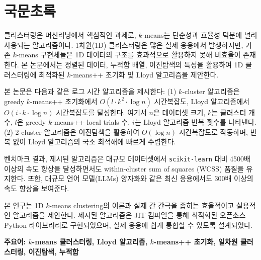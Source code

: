 \chapter*{국문초록}

클러스터링은 머신러닝에서 핵심적인 과제로, $k$-means는 단순성과 효율성 덕분에 널리 사용되는 알고리즘이다. 1차원(1D) 클러스터링은 많은 실제 응용에서 발생하지만, 기존 $k$-means 구현체들은 1D 데이터의 구조를 효과적으로 활용하지 못해 비효율이 존재한다. 본 논문에서는 정렬된 데이터, 누적합 배열, 이진탐색의 특성을 활용하여 1D 클러스터링에 최적화된 $k$-means++ 초기화 및 Lloyd 알고리즘을 제안한다.

본 논문은 다음과 같은 로그 시간 알고리즘을 제시한다: (1) \(k\)-cluster 알고리즘은 greedy $k$-means++ 초기화에서 \(O(l \cdot k^2 \cdot \log n)\) 시간복잡도, Lloyd 알고리즘에서 \(O(i \cdot k \cdot \log n)\) 시간복잡도를 달성한다. 여기서 \(n\)은 데이터셋 크기, \(k\)는 클러스터 개수, \(l\)은 greedy $k$-means++ local trials 수, \(i\)는 Lloyd 알고리즘 반복 횟수를 나타낸다. (2) 2-cluster 알고리즘은 이진탐색을 활용하여 \(O(\log n)\) 시간복잡도로 작동하며, 반복 없이 Lloyd 알고리즘의 국소 최적해에 빠르게 수렴한다.

벤치마크 결과, 제시된 알고리즘은 대규모 데이터셋에서 \texttt{scikit-learn} 대비 4500배 이상의 속도 향상을 달성하면서도 within-cluster sum of squares (WCSS) 품질을 유지한다. 또한, 대규모 언어 모델(LLMs) 양자화와 같은 최신 응용에서도 300배 이상의 속도 향상을 보여준다.

본 연구는 1D $k$-means clustering의 이론과 실제 간 간극을 좁히는 효율적이고 실용적인 알고리즘을 제안한다. 제시된 알고리즘은 JIT 컴파일을 통해 최적화된 오픈소스 Python 라이브러리로 구현되었으며, 실제 응용에 쉽게 통합할 수 있도록 설계되었다.

\vspace*{1cm}
\textbf{주요어: $k$-means 클러스터링, Lloyd 알고리즘, $k$-means++ 초기화, 일차원 클러스터링, 이진탐색, 누적합}

